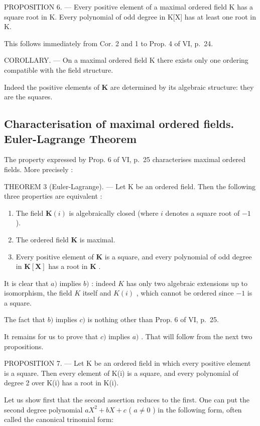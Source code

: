 PROPOSITION 6. --- Every positive element of a maximal ordered field K has a square root in K. Every polynomial of odd degree in K{[}X{]} has at least one root in K.

This follows immediately from Cor. 2 and 1 to Prop. 4 of VI, p.~24.

COROLLARY. --- On a maximal ordered field K there exists only one ordering compatible with the field structure.

Indeed the positive elements of \(\mathbf{K}\) are determined by its algebraic structure: they are the squares.

\subsection{Characterisation of maximal ordered fields. Euler-Lagrange Theorem}

The property expressed by Prop. 6 of VI, p.~25 characterises maximal ordered fields. More precisely :

THEOREM 3 (Euler-Lagrange). --- Let K be an ordered field. Then the following three properties are equivalent :

\begin{enumerate}
\def\labelenumi{\alph{enumi})}
\item
  The field \(\mathbf{K}(i)\) is algebraically closed (where \(i\) denotes a square root of \(-1\) ).
\item
  The ordered field \(\mathbf{K}\) is maximal.
\item
  Every positive element of \(\mathbf{K}\) is a square, and every polynomial of odd degree in \(\mathbf{K}[\mathbf{X}]\) has a root in \(\mathbf{K}\) .
\end{enumerate}

It is clear that \(a)\) implies \(b)\) : indeed \(K\) has only two algebraic extensions up to isomorphism, the field \(K\) itself and \(K(i)\) , which cannot be ordered since \(-1\) is a square.

The fact that \(b)\) implies \(c)\) is nothing other than Prop. 6 of VI, p.~25.

It remains for us to prove that \(c)\) implies \(a)\) . That will follow from the next two propositions.

PROPOSITION 7. --- Let K be an ordered field in which every positive element is a square. Then every element of K(i) is a square, and every polynomial of degree 2 over K(i) has a root in K(i).

Let us show first that the second assertion reduces to the first. One can put the second degree polynomial \(aX^{2} + bX + c\) ( \(a \neq 0\) ) in the following form, often called the canonical trinomial form:

